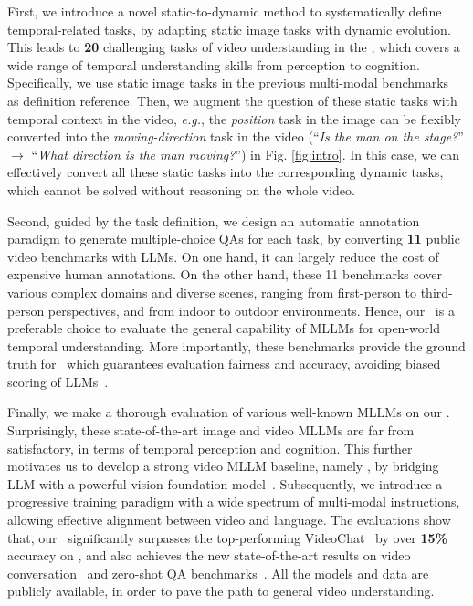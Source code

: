 First,
we introduce a novel static-to-dynamic method to systematically define temporal-related tasks,
by adapting static image tasks with dynamic evolution.
This leads to \textbf{20} challenging tasks of video understanding in the \BenchName,
which covers a wide range of temporal understanding skills from perception to cognition. 
Specifically,
we use static image tasks in the previous multi-modal benchmarks~\cite{mme,mmbench} as definition reference.
Then,
we augment the question of these static tasks with temporal context in the video,
\textit{e.g.},
the \textit{position} task in the image can be flexibly converted into the \textit{moving-direction} task in the video 
(``\textit{Is the man on the stage?}'' $\rightarrow$ ``\textit{What direction is the man moving?}'') in Fig. \ref{fig:intro}. %
In this case,
we can effectively convert all these static tasks into the corresponding dynamic tasks,
which cannot be solved without reasoning on the whole video.

Second,
guided by the task definition,
we design an automatic annotation paradigm to generate multiple-choice QAs for each task,
by converting \textbf{11} public video benchmarks with LLMs.
On one hand,
it can largely reduce the cost of expensive human annotations.
On the other hand,
these 11 benchmarks cover various complex domains and diverse scenes,
ranging from first-person to third-person perspectives, 
and from indoor to outdoor environments.
Hence,
our \BenchName\ is a preferable choice to evaluate the general capability of MLLMs for open-world temporal understanding.
More importantly,
these benchmarks provide the ground truth for \BenchName\,
which guarantees evaluation fairness and accuracy,
avoiding biased scoring of LLMs~\cite{funqa,videochatgpt}.

Finally,
we make a thorough evaluation of various well-known MLLMs on our \BenchName.  
Surprisingly,
these state-of-the-art image and video MLLMs are far from satisfactory,
in terms of temporal perception and cognition.
This further motivates us to develop a strong video MLLM baseline,
namely \textbf{\ModelName},
by bridging LLM with a powerful vision foundation model~\cite{umt}.
Subsequently,
we introduce a progressive training paradigm with a wide spectrum of multi-modal instructions,
allowing effective alignment between video and language.
The evaluations show that,
our \ModelName\ significantly surpasses the top-performing VideoChat~\cite{videochat} by over \textbf{15\%} accuracy on \BenchName,
and also achieves the new state-of-the-art results on video conversation~\cite{videochatgpt} and zero-shot QA benchmarks~\cite{msrvtt_qa,activitynet_qa}. 
All the models and data are publicly available,
in order to pave the path to general video understanding.
